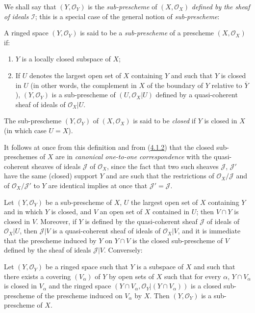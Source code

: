 We shall say that $(Y,\mathscr{O}_Y)$ is the \emph{sub-prescheme} of
$(X,\mathscr{O}_X)$ \emph{defined by the sheaf of ideals $\mathscr{I}$};
this is a special case of the general notion of \emph{sub-prescheme}:

\begin{definition}[4.1.3]
\label{I.4.1.3}
A ringed space $(Y,\mathscr{O}_Y)$ is said to be a
\emph{sub-prescheme} of a prescheme $(X,\mathscr{O}_X)$ if:
\begin{enumerate}
  \item[$1^\circ$] $Y$ is a locally closed subspace of $X$;
  \item[$2^\circ$] If $U$ denotes the largest open set of $X$ containing $Y$
  and such that $Y$ is closed in $U$ (in other words, the complement in
  $X$ of the boundary of $Y$ relative to $\overline{Y}$),
  $(Y,\mathscr{O}_Y)$ is a sub-prescheme of
  $(U,\mathscr{O}_X|U)$ defined by a quasi-coherent sheaf of ideals of
  $\mathscr{O}_X|U$.
\end{enumerate}
The sub-prescheme $(Y,\mathscr{O}_Y)$ of $(X,\mathscr{O}_X)$ is said to be
\emph{closed} if $Y$ is closed in $X$ (in which case $U=X$).
\end{definition}

It follows at once from this definition and from
(\hyperref[I.4.1.2]{4.1.2}) that the closed sub-preschemes of $X$ are in
\emph{canonical one-to-one correspondence} with the quasi-coherent sheaves of
ideals $\mathscr{J}$ of $\mathscr{O}_X$, since the fact that two such
sheaves $\mathscr{J}$, $\mathscr{J}'$ have the same (closed) support $Y$ and
are such that the restrictions of $\mathscr{O}_X/\mathscr{J}$ and of
$\mathscr{O}_X/\mathscr{J}'$ to $Y$ are identical implies at once that
$\mathscr{J}'=\mathscr{J}$.

\begin{env}[4.1.4]
\label{I.4.1.4}
Let $(Y,\mathscr{O}_Y)$ be a sub-prescheme of $X$, $U$ the largest open set
of $X$ containing $Y$ and in which $Y$ is closed, and $V$ an open set of $X$
contained in $U$; then $V\cap Y$ is closed in $V$. Moreover, if $Y$ is
defined by the quasi-coherent sheaf $\mathscr{J}$ of ideals of
$\mathscr{O}_X|U$, then $\mathscr{J}|V$ is a quasi-coherent sheaf of ideals of
$\mathscr{O}_X|V$, and it is immediate that the prescheme induced by $Y$ on
$Y\cap V$ is the closed sub-prescheme of $V$ defined by the sheaf of ideals
$\mathscr{J}|V$. Conversely:
\end{env}

\begin{proposition}[4.1.5]
\label{I.4.1.5}
Let $(Y,\mathscr{O}_Y)$ be a ringed space such that $Y$ is a subspace of
$X$ and such that there exists a covering $(V_\alpha)$ of $Y$ by open sets of
$X$ such that for every $\alpha$, $Y\cap V_\alpha$ is closed in $V_\alpha$
and the ringed space
$(Y\cap V_\alpha,\mathscr{O}_Y|(Y\cap V_\alpha))$ is a closed
sub-prescheme of the prescheme induced on $V_\alpha$ by $X$. Then
$(Y,\mathscr{O}_Y)$ is a sub-prescheme of $X$.
\end{proposition}

